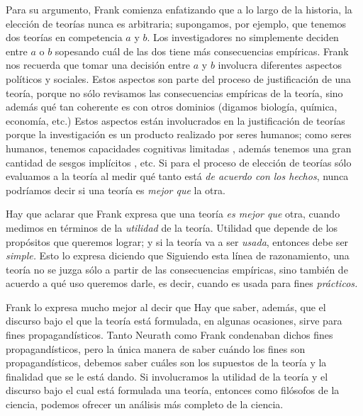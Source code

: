 Para su argumento, Frank comienza enfatizando que a lo largo de la historia, la elección de teorías nunca es arbitraria;
supongamos, por ejemplo, que tenemos dos teorías en competencia $a$ y $b$.
Los investigadores no simplemente deciden entre $a$ o $b$ sopesando cuál de las dos tiene más consecuencias empíricas.
Frank nos recuerda que tomar una decisión entre $a$ y $b$ involucra diferentes aspectos políticos y sociales.
Estos aspectos son parte del proceso de justificación de una teoría, porque no sólo revisamos las consecuencias empíricas de la teoría, sino además qué tan coherente es con otros dominios (digamos biología, química, economía, etc.)
Estos aspectos están involucrados en la justificación de teorías  porque la investigación es un producto realizado por seres humanos;
como seres humanos, tenemos capacidades cognitivas limitadas \parencite{Potochnik2017-POTIAT-3}, además tenemos una gran cantidad de sesgos implícitos \parencite{nordell2021end}, etc.
Si para el proceso de elección de teorías sólo evaluamos a la teoría al medir qué tanto está \emph{de acuerdo con los hechos}, nunca podríamos decir si una teoría es \emph{mejor que} la otra.

Hay que aclarar que Frank expresa que una teoría \emph{es mejor que} otra, cuando medimos  en términos de la \emph{utilidad} de la teoría.
Utilidad que depende de los propósitos que queremos lograr;
y si la teoría va a ser \emph{usada}, entonces debe ser \emph{simple.}
Esto lo expresa diciendo que  
Siguiendo esta línea de razonamiento, una teoría no se juzga sólo a partir de las consecuencias empíricas, sino también de acuerdo a qué uso queremos darle, es decir, cuando es usada para fines \emph{prácticos.}

Frank lo expresa mucho mejor al decir que  \parencite[p.~4]{Frank1956}
Hay que saber, además, que el discurso bajo el que la teoría está formulada, en algunas ocasiones, sirve para fines propagandísticos.
Tanto Neurath como Frank condenaban dichos fines propagandísticos, pero la única manera de saber cuándo los fines son propagandísticos, debemos saber cuáles son los supuestos de la teoría y la finalidad que se le está dando.
Si involucramos la utilidad de la teoría y el discurso bajo el cual está formulada una teoría, entonces como filósofos de la ciencia,  podemos ofrecer un análisis más completo de la ciencia.

